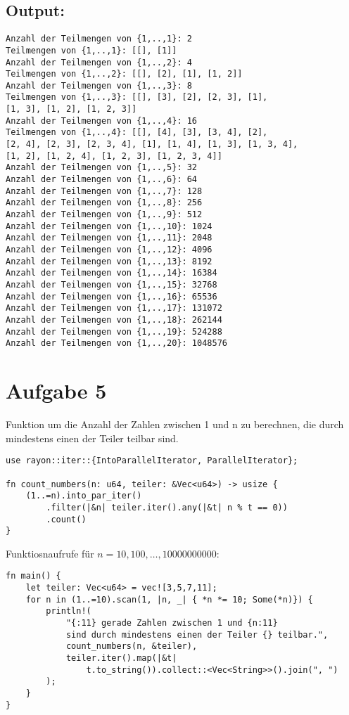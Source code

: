 \documentclass[a4paper]{scrartcl}
\begin{document}
\subsection*{Output:}
\begin{lstlisting}
Anzahl der Teilmengen von {1,..,1}: 2
Teilmengen von {1,..,1}: [[], [1]]
Anzahl der Teilmengen von {1,..,2}: 4
Teilmengen von {1,..,2}: [[], [2], [1], [1, 2]]
Anzahl der Teilmengen von {1,..,3}: 8
Teilmengen von {1,..,3}: [[], [3], [2], [2, 3], [1], 
[1, 3], [1, 2], [1, 2, 3]]
Anzahl der Teilmengen von {1,..,4}: 16
Teilmengen von {1,..,4}: [[], [4], [3], [3, 4], [2], 
[2, 4], [2, 3], [2, 3, 4], [1], [1, 4], [1, 3], [1, 3, 4], 
[1, 2], [1, 2, 4], [1, 2, 3], [1, 2, 3, 4]]
Anzahl der Teilmengen von {1,..,5}: 32
Anzahl der Teilmengen von {1,..,6}: 64
Anzahl der Teilmengen von {1,..,7}: 128
Anzahl der Teilmengen von {1,..,8}: 256
Anzahl der Teilmengen von {1,..,9}: 512
Anzahl der Teilmengen von {1,..,10}: 1024
Anzahl der Teilmengen von {1,..,11}: 2048
Anzahl der Teilmengen von {1,..,12}: 4096
Anzahl der Teilmengen von {1,..,13}: 8192
Anzahl der Teilmengen von {1,..,14}: 16384
Anzahl der Teilmengen von {1,..,15}: 32768
Anzahl der Teilmengen von {1,..,16}: 65536
Anzahl der Teilmengen von {1,..,17}: 131072
Anzahl der Teilmengen von {1,..,18}: 262144
Anzahl der Teilmengen von {1,..,19}: 524288
Anzahl der Teilmengen von {1,..,20}: 1048576
\end{lstlisting}

\newpage
\section*{Aufgabe 5}
Funktion um die Anzahl der Zahlen zwischen 1 und n zu berechnen, die durch mindestens einen der Teiler teilbar sind.
\begin{lstlisting}
use rayon::iter::{IntoParallelIterator, ParallelIterator};

fn count_numbers(n: u64, teiler: &Vec<u64>) -> usize {
    (1..=n).into_par_iter()
        .filter(|&n| teiler.iter().any(|&t| n % t == 0))
        .count()
}   
\end{lstlisting}

Funktiosnaufrufe für $ n = 10, 100 , \ldots, 10000000000 $:

\begin{lstlisting}
fn main() {
    let teiler: Vec<u64> = vec![3,5,7,11];
    for n in (1..=10).scan(1, |n, _| { *n *= 10; Some(*n)}) {
        println!(
            "{:11} gerade Zahlen zwischen 1 und {n:11} 
            sind durch mindestens einen der Teiler {} teilbar.", 
            count_numbers(n, &teiler), 
            teiler.iter().map(|&t| 
                t.to_string()).collect::<Vec<String>>().join(", ")
        );
    }  
} 
\end{lstlisting}
\end{document}
